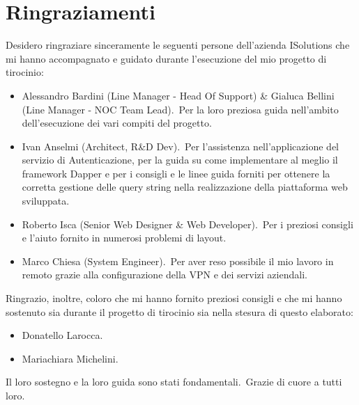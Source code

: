 \chapter*{Ringraziamenti}
Desidero ringraziare sinceramente le seguenti persone dell'azienda ISolutions che mi hanno 
accompagnato e guidato durante l'esecuzione del mio progetto di tirocinio:
\begin{itemize}
    \item Alessandro Bardini (Line Manager \-- Head Of Support) \& Gialuca Bellini (Line Manager \-- NOC Team Lead).\ Per la loro preziosa guida nell'ambito dell'esecuzione dei vari compiti del progetto.
    \item Ivan Anselmi (Architect, R\&D Dev).\ Per l'assistenza nell'applicazione del servizio di Autenticazione, per la guida su come implementare al meglio il framework Dapper e per i consigli e le linee guida forniti per ottenere la corretta gestione delle query string nella realizzazione della piattaforma web sviluppata.
    \item Roberto Isca (Senior Web Designer \& Web Developer).\ Per i preziosi consigli e l'aiuto fornito in numerosi problemi di layout.
    \item Marco Chiesa (System Engineer).\ Per aver reso possibile il mio lavoro in remoto grazie alla configurazione della VPN e dei servizi aziendali.
\end{itemize}
%
Ringrazio, inoltre, coloro che mi hanno fornito preziosi consigli e che mi hanno sostenuto sia durante il progetto di tirocinio sia nella stesura di questo elaborato:
\begin{itemize}
    \item Donatello Larocca.
    \item Mariachiara Michelini.
\end{itemize}
%
Il loro sostegno e la loro guida sono stati fondamentali.\ Grazie di cuore a tutti loro.